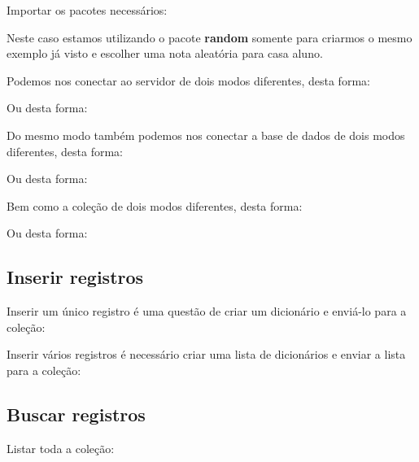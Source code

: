 \documentclass[a4paper,11pt]{article}
\begin{document}
Importar os pacotes necessários: \\

Neste caso estamos utilizando o pacote \textbf{random} somente para criarmos o mesmo exemplo já visto e escolher uma nota aleatória para casa aluno.

Podemos nos conectar ao servidor de dois modos diferentes, desta forma: \\

Ou desta forma: \\

Do mesmo modo também podemos nos conectar a base de dados de dois modos diferentes, desta forma: \\

Ou desta forma: \\

Bem como a coleção de dois modos diferentes, desta forma: \\

Ou desta forma: \\

\subsection{Inserir registros}
Inserir um único registro é uma questão de criar um dicionário e enviá-lo para a coleção: \\

Inserir vários registros é necessário criar uma lista de dicionários e enviar a lista para a coleção: \\

\subsection{Buscar registros}
Listar toda a coleção: \\
\end{document}
